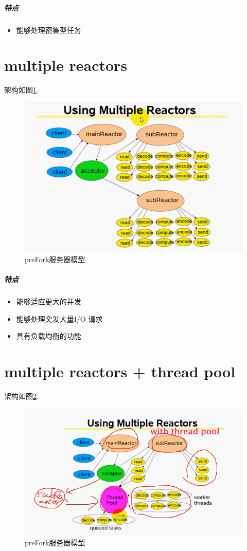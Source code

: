 \documentclass[UTF8,a4paper,12pt]{ctexbook}
\begin{document}
		\subparagraph{特点}
			\begin{itemize}
				\item 能够处理密集型任务
			\end{itemize}
	\newpage
	\section{multiple reactors}
		架构如图\ref{MultipleReactors}.
		
		\begin{figure}[htbp]
			\centering
			\includegraphics[scale = 0.8]{figures/MultipleReactors.png}
			\caption{preFork服务器模型}
			\label{MultipleReactors}
		\end{figure}
		
		\subparagraph{特点}
		\begin{itemize}
			\item 能够适应更大的并发
			\item 能够处理突发大量I/O 请求
			\item 具有负载均衡的功能
		\end{itemize}
	
	
	\newpage
	\section{multiple reactors + thread pool}
		架构如图\ref{MultipleReactorsThreadpool}.
		
		\begin{figure}[htbp]
			\centering
			\includegraphics[scale = 0.7]{figures/MultipleReactorsThreadpool.png}
			\caption{preFork服务器模型}
			\label{MultipleReactorsThreadpool}
		\end{figure}
		
\end{document}

